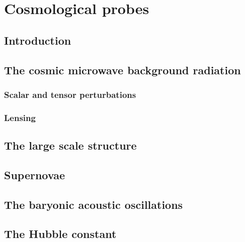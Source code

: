\chapter{Cosmological probes}
\label{chapter:5}

\section{Introduction} 

\section{The cosmic microwave background radiation}

\subsection{Scalar and tensor perturbations}

\subsection{Lensing}

\section{The large scale structure}

\section{Supernovae}

\section{The baryonic acoustic oscillations}

\section{The Hubble constant}


